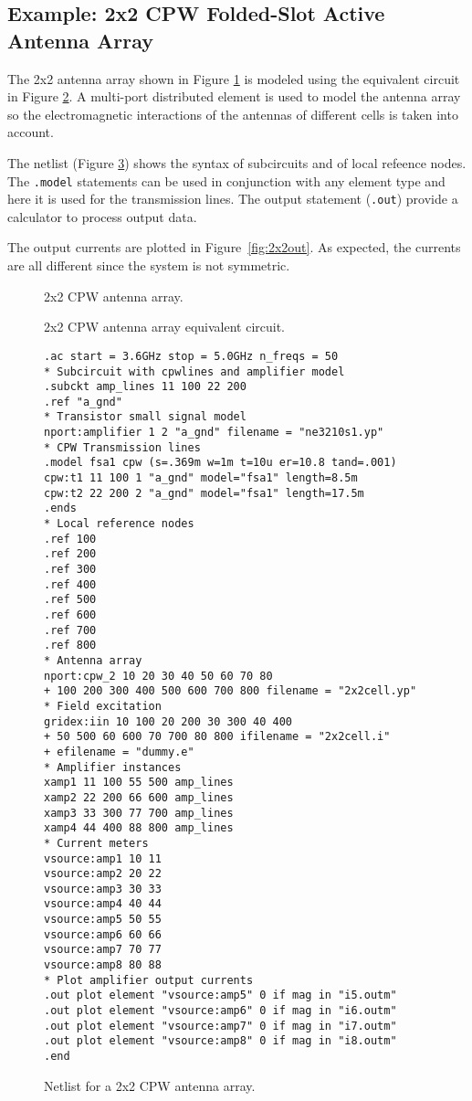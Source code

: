 \subsection{Example: 2x2 CPW Folded-Slot Active Antenna Array}

The 2x2 antenna array shown in Figure \ref{fig:2x2array} is modeled
using the equivalent circuit in Figure \ref{fig:2x2circuit}. A
multi-port distributed element is used to model the antenna array so
the electromagnetic interactions of the antennas of different cells is
taken into account.

The netlist (Figure \ref{fig:2x2netlist}) shows the syntax of
subcircuits and of local refeence nodes. The {\tt .model} statements
can be used in conjunction with any element type and here it is used
for the transmission lines. The output statement ({\tt .out}) provide
a calculator to process output data.

The output currents are plotted in Figure~\ref{fig:2x2out}. As expected,
the currents are all different since the system is not symmetric.

%
\begin{figure}[htpb]
\centerline{\epsfxsize=13cm }
\caption{2x2 CPW antenna array.}
\label{fig:2x2array}
\end{figure}
%

%
\begin{figure}[htpb]
\centerline{\epsfxsize=8cm }
\caption{2x2 CPW antenna array equivalent circuit.}
\label{fig:2x2circuit}
\end{figure}
%
%
\begin{figure}[htpb]
{\scriptsize
\begin{verbatim}
.ac start = 3.6GHz stop = 5.0GHz n_freqs = 50
* Subcircuit with cpwlines and amplifier model
.subckt amp_lines 11 100 22 200 
.ref "a_gnd"
* Transistor small signal model
nport:amplifier 1 2 "a_gnd" filename = "ne3210s1.yp" 
* CPW Transmission lines
.model fsa1 cpw (s=.369m w=1m t=10u er=10.8 tand=.001)
cpw:t1 11 100 1 "a_gnd" model="fsa1" length=8.5m
cpw:t2 22 200 2 "a_gnd" model="fsa1" length=17.5m
.ends
* Local reference nodes 
.ref 100
.ref 200
.ref 300
.ref 400
.ref 500
.ref 600
.ref 700
.ref 800
* Antenna array
nport:cpw_2 10 20 30 40 50 60 70 80
+ 100 200 300 400 500 600 700 800 filename = "2x2cell.yp" 
* Field excitation
gridex:iin 10 100 20 200 30 300 40 400 
+ 50 500 60 600 70 700 80 800 ifilename = "2x2cell.i" 
+ efilename = "dummy.e" 
* Amplifier instances
xamp1 11 100 55 500 amp_lines
xamp2 22 200 66 600 amp_lines
xamp3 33 300 77 700 amp_lines
xamp4 44 400 88 800 amp_lines
* Current meters
vsource:amp1 10 11 
vsource:amp2 20 22
vsource:amp3 30 33
vsource:amp4 40 44
vsource:amp5 50 55
vsource:amp6 60 66
vsource:amp7 70 77
vsource:amp8 80 88
* Plot amplifier output currents
.out plot element "vsource:amp5" 0 if mag in "i5.outm"
.out plot element "vsource:amp6" 0 if mag in "i6.outm"
.out plot element "vsource:amp7" 0 if mag in "i7.outm"
.out plot element "vsource:amp8" 0 if mag in "i8.outm"
.end
\end{verbatim}
}
\caption{Netlist for a 2x2 CPW antenna array.}
\label{fig:2x2netlist}
\end{figure}
%


